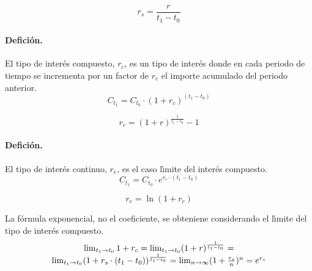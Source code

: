 \begin{equation}
\label{interes_simple_1}
r_s = \frac{r}{t_1 - t_0}
\end{equation}

\paragraph{Defici\'on.}
El tipo de inter\'es compuesto, $r_c$, es un tipo de inter\'es donde en cada 
periodo de tiempo se incrementa por un factor de $r_c$ el importe acumulado del 
periodo anterior.
\begin{equation}
C_{t_1} = C_{t_0} \cdot (1+ r_c)^{(t_1-t_0)} 
\end{equation}

\begin{equation}
\label{interes_compuesto_1}
r_c = (1 + r) ^ \frac{1}{t_1-t_0} - 1
\end{equation}

\paragraph{Defici\'on.}
El tipo de inter\'es continuo, $r_e$, es el caso l\'\i mite del inter\'es 
compuesto. 
\begin{equation}
C_{t_1} = C_{t_0} \cdot e^{r_e \cdot (t_1-t_0)}
\end{equation}

\begin{equation}
\label{interes_continuo_2}
r_e = \ln(1 + r_c)
\end{equation}

La f\'ormula exponencial, no el coeficiente, se obteniene considerando el
l\'\i mite del tipo de inter\'es compuesto.
\begin{equation}
\label{interes_continuo_1}
\begin{array}{c}
\lim_{t_1 \rightarrow t_0} 1+r_c = 
\lim_{t_1 \rightarrow t_0} (1 + r)^{\frac{1}{t_1 - t_0}} = \cr
\lim_{t_1 \rightarrow t_0} (1 + r_s \cdot (t_1-t_0)) ^ {\frac{1}{t_1 - t_0}} =
\lim_{n \rightarrow \infty} (1 + \frac{r_s}{n}) ^ {n} = 
e^{r_s}
\end{array}
\end{equation}

